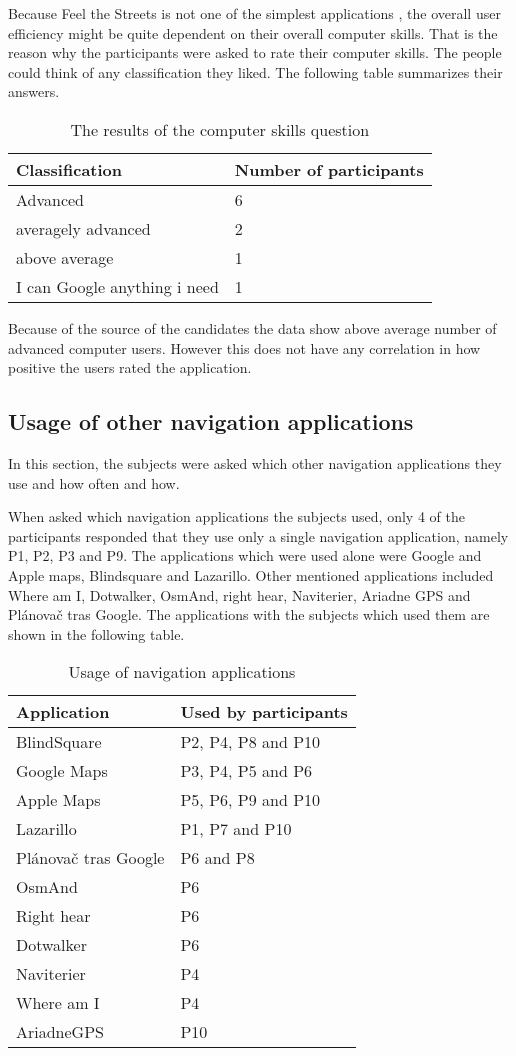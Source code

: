 \documentclass[nolof,digital]{fithesis3}
\begin{document}
Because Feel the Streets is not one of the simplest applications , the overall user efficiency might be quite dependent on their overall computer skills. That is the reason why the participants were asked to rate their computer skills. The people could think of any classification they liked. The following table summarizes their answers.
\begin{table}
\caption{The results of the computer skills question}
\begin{tabularx}{\textwidth}{ |X|X| }
Classification & Number of participants \\
\hline
Advanced & 6 \\
averagely advanced & 2 \\
above average & 1 \\
I can Google anything i need & 1 \\
\end{tabularx}
\end{table}
Because of the source of the candidates the data show above average number of advanced computer users. However this does not have any correlation in how positive the users rated the application.
\subsection{Usage of other navigation applications}
In this section, the subjects were asked which other navigation applications they use and how often and how.

When asked which navigation applications the subjects used, only 4 of the participants responded that they use only a single navigation application, namely P1, P2, P3 and P9. The applications which were used alone were Google and Apple maps, Blindsquare and Lazarillo. Other mentioned applications included Where am I, Dotwalker, OsmAnd, right hear, Naviterier, Ariadne GPS and Plánovač tras Google. The applications with the subjects which used them are shown in the following table.

\begin{table}
\caption{Usage of navigation applications}
\begin{tabularx}{\textwidth}{|X|X|}
Application & Used by participants \\
\hline
BlindSquare & P2, P4, P8 and P10 \\
Google Maps & P3, P4, P5 and P6 \\
Apple Maps & P5, P6, P9 and P10 \\
Lazarillo & P1, P7 and P10 \\
Plánovač tras Google & P6 and P8 \\
OsmAnd & P6 \\
Right hear & P6 \\
Dotwalker & P6 \\
Naviterier & P4 \\
Where am I & P4 \\
AriadneGPS & P10 \\
\end{tabularx}
\end{table}
\end{document}
